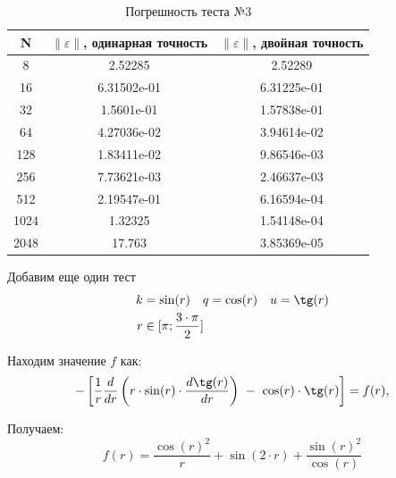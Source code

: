   \begin{table}[H]
    \centering
    \begin{tabular}{c | c | c}
      \toprule
      N & $ \left\lVert \varepsilon \right\rVert  $, одинарная точность & $ \left\lVert \varepsilon \right\rVert  $, двойная точность \\
      \midrule
      8 & 2.52285 & 2.52289\\
      16 & 6.31502e-01 & 6.31225e-01\\
      32 & 1.5601e-01 & 1.57838e-01\\
      64 & 4.27036e-02 & 3.94614e-02\\
      128 & 1.83411e-02 & 9.86546e-03\\
      256 & 7.73621e-03 & 2.46637e-03\\
      512 & 2.19547e-01 & 6.16594e-04\\
      1024 & 1.32325 & 1.54148e-04\\
      2048 & 17.763 & 3.85369e-05\\
      \bottomrule
    \end{tabular}
    \caption{Погрешность теста №3}
  \end{table}

  Добавим еще один тест
  \begin{align*}
    k &= \sin(r) \quad q = \cos(r) \quad u = \tg(r) \\
    r &\in [\pi; \frac{3 \cdot \pi}{2} ]
  \end{align*}

  Находим значение $f$ как:
  \[
    -\left[ \frac{1}{r} \frac{d}{dr} \left(r \cdot \sin(r) \cdot \frac{d \tg(r)}{dr} \right)\ -\ \cos(r) \cdot \tg(r) \right] = f(r),
  \]

  Получаем:
  \[
    f(r) = \frac{\cos(r)^2}{r} + \sin(2 \cdot r) + \frac{\sin(r)^2}{\cos(r)}
  \]

